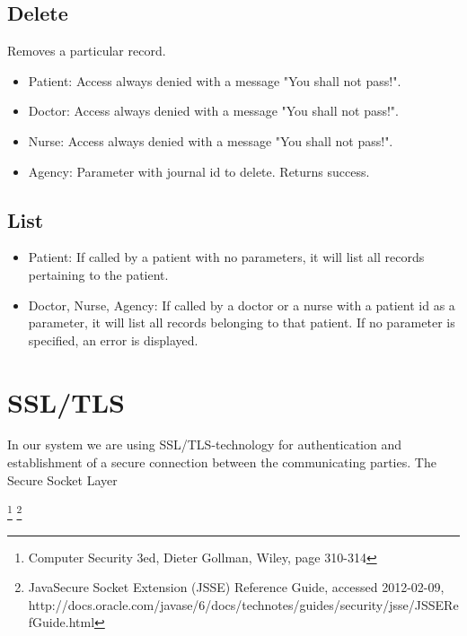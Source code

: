 \documentclass[10pt, a4paper]{article}
\begin{document}
\subsection{Delete}
Removes a particular record.
\begin{itemize}
\item Patient: Access always denied with a message "You shall not pass!".
\item Doctor: Access always denied with a message "You shall not pass!".
\item Nurse: Access always denied with a message "You shall not pass!".
\item Agency: Parameter with journal id to delete. Returns success.
\end{itemize}

\subsection{List}
\begin{itemize}
\item Patient: If called by a patient with no parameters, it will list all records pertaining to the patient.
\item Doctor, Nurse, Agency: If called by a doctor or a nurse with a patient id as a parameter, it will list all records belonging to that patient. If no parameter is specified, an error is displayed.
\end{itemize}


\section{SSL/TLS}
In our system we are using SSL/TLS-technology for authentication and establishment of a secure connection between the communicating parties. The Secure Socket Layer 




\footnote{Computer Security 3ed, Dieter Gollman, Wiley, page 310-314}
\footnote{Java\textregistered Secure Socket Extension (JSSE) Reference Guide, accessed 2012-02-09, http://docs.oracle.com/javase/6/docs/technotes/guides/security/jsse/JSSERefGuide.html}
\end{document}
